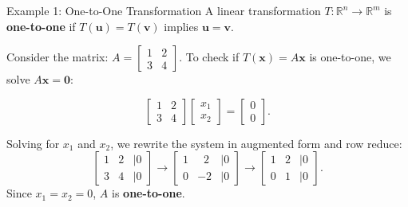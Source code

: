 \documentclass[10pt, aspectratio=169]{beamer}
\begin{document}
\begin{frame}{Example 1: One-to-One Transformation}
A linear transformation \(T: \mathbb{R}^n \to \mathbb{R}^m\) is \textbf{one-to-one} if \(T(\mathbf{u}) = T(\mathbf{v})\) implies \(\mathbf{u} = \mathbf{v}\).

Consider the matrix:
\(
A =
\begin{bmatrix}
    1 & 2 \\ 3 & 4
\end{bmatrix}.
\)
To check if \(T(\mathbf{x}) = A\mathbf{x}\) is one-to-one, we solve \(A\mathbf{x} = \mathbf{0}\):

\[
\begin{bmatrix}
    1 & 2 \\ 3 & 4
\end{bmatrix}
\begin{bmatrix}
    x_1 \\ x_2
\end{bmatrix}
=
\begin{bmatrix}
    0 \\ 0
\end{bmatrix}.
\]

Solving for \(x_1\) and \(x_2\), we rewrite the system in augmented form and row reduce:
\[
\begin{bmatrix}
    1 & 2 & | 0 \\
    3 & 4 & | 0
\end{bmatrix}
\rightarrow
\begin{bmatrix}
    1 & \;\;2 & | 0 \\
    0 & -2 & | 0
\end{bmatrix}
\rightarrow
\begin{bmatrix}
    1 & 2 & | 0 \\
    0 & 1 & | 0
\end{bmatrix}.
\]
Since \(x_1 = x_2 = 0\), \(A\) is \textbf{one-to-one}.
\end{frame}
\end{document}
